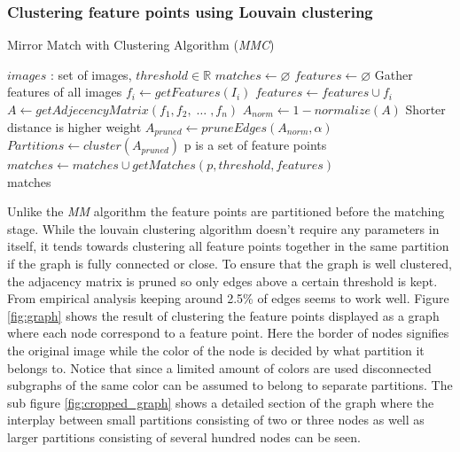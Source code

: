 \documentclass{article}
\begin{document}
\subsubsection{Clustering feature points using Louvain clustering}

\begin{algorithm}
\caption{Mirror Match with Clustering Algorithm (\emph{MMC})}
\label{alg-mmc}
\begin{algorithmic}
\Require $images$ : set of images, $threshold \in \mathbb{R}$
\State $matches\gets \varnothing$
\State $features\gets \varnothing$
 \Comment Gather features of all images
	\State $f_i\gets getFeatures(I_i)$
	\State $features\gets features \cup f_i$
\EndFor
\State $A\gets getAdjecencyMatrix(f_1, f_2,\; \ldots \;, f_n)$
\State $A_{norm}\gets 1 - normalize(A)$
\Comment Shorter distance is higher weight
\State $A_{pruned}\gets pruneEdges(A_{norm},\alpha)$
\State $Partitions\gets cluster(A_{pruned})$
 \Comment p is a set of feature points
	\State $matches\gets matches \cup getMatches(p, threshold, 
features)$
\EndFor \\
\Return matches
\end{algorithmic}
\end{algorithm}

Unlike the \emph{MM} algorithm the feature points are partitioned before 
the matching stage. While the louvain clustering algorithm doesn't 
require any parameters in itself, it tends towards clustering all 
feature points together in the same partition if the graph is fully 
connected or close. To ensure that the graph is well clustered, the 
adjacency matrix is pruned so only edges above a certain threshold is 
kept. From empirical analysis keeping around 2.5\% of edges seems to 
work well. Figure \ref{fig:graph} shows the result of clustering the 
feature points displayed as a graph where each node correspond to a 
feature point. Here the border of nodes signifies the original image 
while the color of the node is decided by what partition it belongs to.  
Notice that since a limited amount of colors are used disconnected 
subgraphs of the same color can be assumed to belong to separate 
partitions. The sub figure \ref{fig:cropped_graph} shows a detailed 
section of the graph where the interplay between small partitions 
consisting of two or three nodes as well as larger partitions consisting 
of several hundred nodes can be seen.
\end{document}
